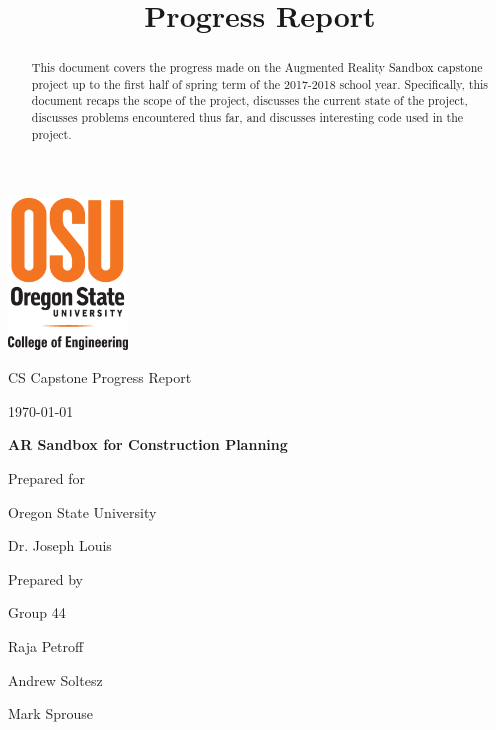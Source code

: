 \documentclass[onecolumn, draftclsnofoot,10pt, compsoc]{IEEEtran}
\title{Progress Report}
\def \CapstoneTeamName{		Team Sandy}
\def \CapstoneTeamNumber{		44}
\def \GroupMemberOne{			Raja Petroff			}
\def \GroupMemberTwo{			Andrew Soltesz			}
\def \GroupMemberThree{			Mark Sprouse}
\def \CapstoneProjectName{		AR Sandbox for Construction Planning}
\def \CapstoneSponsorCompany{	Oregon State University}
\def \CapstoneSponsorPerson{		Dr. Joseph Louis}
\def \DocType{		%
				Progress Report
				}
\newcommand{\NameSigPair}[1]{\par
\makebox[2.75in][r]{#1} \hfil 	\makebox[3.25in]{\makebox[2.25in]{\hrulefill} \hfill		\makebox[.75in]{\hrulefill}}
\par\vspace{-12pt} \textit{\tiny\noindent
\makebox[2.75in]{} \hfil		\makebox[3.25in]{\makebox[2.25in][r]{Signature} \hfill	\makebox[.75in][r]{Date}}}}
\renewcommand{\NameSigPair}[1]{#1}
\begin{document}
\begin{titlepage}
    \begin{singlespace}
    	\includegraphics[height=4cm]{coe_v_spot1}
        \hfill 
        \par\vspace{.2in}
        \centering
        \scshape{
            \huge CS Capstone \DocType \par
            {\large\today}\par
            \vspace{.5in}
            \textbf{\Huge\CapstoneProjectName}\par
            \vfill
            {\large Prepared for}\par
            \Huge \CapstoneSponsorCompany\par
            \vspace{5pt}
            {\Large\NameSigPair{\CapstoneSponsorPerson}\par}
            {\large Prepared by }\par
            Group\CapstoneTeamNumber\par
            \vspace{5pt}
            {\Large
                \NameSigPair{\GroupMemberOne}\par
                \NameSigPair{\GroupMemberTwo}\par
                \NameSigPair{\GroupMemberThree}\par
            }
            \vspace{20pt}
        }
        \begin{abstract}
        This document covers the progress made on the Augmented Reality Sandbox capstone project up to the first half of spring term of the 2017-2018 school year. Specifically, this document recaps the scope of the project, discusses the current state of the project, discusses problems encountered thus far, and discusses interesting code used in the project.
        \end{abstract}     
    \end{singlespace}
\end{titlepage}
\newpage
{}
\tableofcontents
\clearpage
\end{document}
